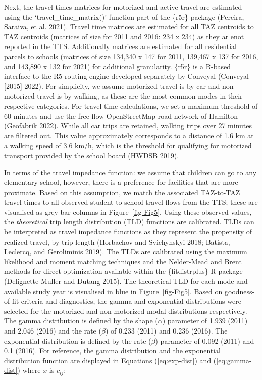 \documentclass[
default
]{sn-jnl}
\begin{document}
Next, the travel times matrices for motorized and active travel are
estimated using the `travel\_time\_matrix()' function part of the
\{r5r\} package (Pereira, Saraiva, et al. 2021). Travel time matrices
are estimated for all TAZ centroids to TAZ centroids (matrices of size
for 2011 and 2016: 234 x 234) as they ar enot reported in the TTS.
Additionally matrices are estimated for all residential parcels to
schools (matrices of size 134,340 x 147 for 2011, 139,467 x 137 for
2016, and 143,890 x 132 for 2021) for additional granularity. \{r5r\} is
a R-based interface to the R5 routing engine developed separately by
Conveyal (Conveyal {[}2015{]} 2022). For simplicity, we assume motorized
travel is by car and non-motorized travel is by walking, as these are
the most common modes in their respective categories. For travel time
calculations, we set a maximum threshold of 60 minutes and use the
free-flow OpenStreetMap road network of Hamilton (Geofabrik 2022). While
all car trips are retained, walking trips over 27 minutes are filtered
out. This value approximately corresponds to a distance of 1.6 km at a
walking speed of 3.6 km/h, which is the threshold for qualifying for
motorized transport provided by the school board (HWDSB 2019).

In terms of the travel impedance function: we assume that children can
go to any elementary school, however, there is a preference for
facilities that are more proximate. Based on this assumption, we match
the associated TAZ-to-TAZ travel times to all observed student-to-school
travel flows from the TTS; these are visualised as grey bar columns in
Figure~\ref{fig-Fig5}. Using these observed values, the
\emph{theoretical} trip length distribution (TLD) functions are
calibrated. TLDs can be interpreted as travel impedance functions as
they represent the propensity of realized travel, by trip length
(Horbachov and Svichynskyi 2018; Batista, Leclercq, and Geroliminis
2019). The TLDs are calibrated using the maximum likelihood and moment
matching techniques and the Nelder-Mead and Brent methods for direct
optimization available within the \{fitdistrplus\} R package
(Delignette-Muller and Dutang 2015). The theoretical TLD for each mode
and available study year is visualised in blue in Figure~\ref{fig-Fig5}.
Based on goodness-of-fit criteria and diagnostics, the gamma and
exponential distributions were selected for the motorized and
non-motorized modal distributions respectively. The gamma distribution
is defined by the shape (\(\alpha\)) parameter of 1.939 (2011) and 2.046
(2016) and the rate (\(\beta\)) of 0.233 (2011) and 0.236 (2016). The
exponential distribution is defined by the rate (\(\beta\)) parameter of
0.092 (2011) and 0.1 (2016). For reference, the gamma distribution and
the exponential distribution function are displayed in Equations
(\ref{eq:exp-dist}) and (\ref{eq:gamma-dist}) where \(x\) is \(c_{ij}\):
\end{document}
